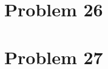 \documentclass[12pt]{article}
\begin{document}
\section{Problem 26}

\section{Problem 27}
\end{document}

